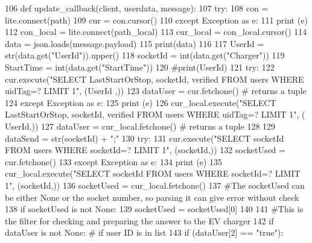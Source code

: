 \begin{DoxyCode}
106 \textcolor{keyword}{def }update_callback(client, userdata, message):
107     \textcolor{keywordflow}{try}:
108         con = lite.connect(path)
109         cur = con.cursor()
110     \textcolor{keywordflow}{except} Exception \textcolor{keyword}{as} e:
111         \textcolor{keywordflow}{print} (e)
112     con\_local = lite.connect(path\_local)
113     cur\_local = con\_local.cursor()
114     data = json.loads(message.payload)
115     print(data)
116     
117     UserId = str(data.get(\textcolor{stringliteral}{"UserId"})).upper()
118     socketId = int(data.get(\textcolor{stringliteral}{"Charger"}))
119     StartTime = int(data.get(\textcolor{stringliteral}{"StartTime"}))
120     \textcolor{comment}{#print(UserId)}
121     \textcolor{keywordflow}{try}:
122         cur.execute(\textcolor{stringliteral}{"SELECT LastStartOrStop, socketId, verified FROM users WHERE uidTag=? LIMIT 1"}, (UserId
      ,))
123         dataUser = cur.fetchone() \textcolor{comment}{# returns a tuple}
124     \textcolor{keywordflow}{except} Exception \textcolor{keyword}{as} e:
125         \textcolor{keywordflow}{print} (e)
126         cur\_local.execute(\textcolor{stringliteral}{"SELECT LastStartOrStop, socketId, verified FROM users WHERE uidTag=? LIMIT 1"}, (
      UserId,))
127         dataUser = cur\_local.fetchone() \textcolor{comment}{# returns a tuple}
128     
129     dataSend = str(socketId) + \textcolor{stringliteral}{";"}
130     \textcolor{keywordflow}{try}:
131         cur.execute(\textcolor{stringliteral}{"SELECT socketId FROM users WHERE socketId=? LIMIT 1"}, (socketId,))
132         socketUsed = cur.fetchone()
133     \textcolor{keywordflow}{except} Exception \textcolor{keyword}{as} e:
134         \textcolor{keywordflow}{print} (e)
135         cur\_local.execute(\textcolor{stringliteral}{"SELECT socketId FROM users WHERE socketId=? LIMIT 1"}, (socketId,))
136         socketUsed = cur\_local.fetchone()
137     \textcolor{comment}{#The socketUsed can be either None or the socket number, so parsing it can give error without check}
138     \textcolor{keywordflow}{if} socketUsed \textcolor{keywordflow}{is} \textcolor{keywordflow}{not} \textcolor{keywordtype}{None}:
139         socketUsed = socketUsed[0]
140         
141     \textcolor{comment}{#This is the filter for checking and preparing the answer to the EV charger}
142     \textcolor{keywordflow}{if} dataUser \textcolor{keywordflow}{is} \textcolor{keywordflow}{not} \textcolor{keywordtype}{None}: \textcolor{comment}{# if user ID is in list}
143         \textcolor{keywordflow}{if} (dataUser[2] == \textcolor{stringliteral}{"true"}):

\end{DoxyCode}
